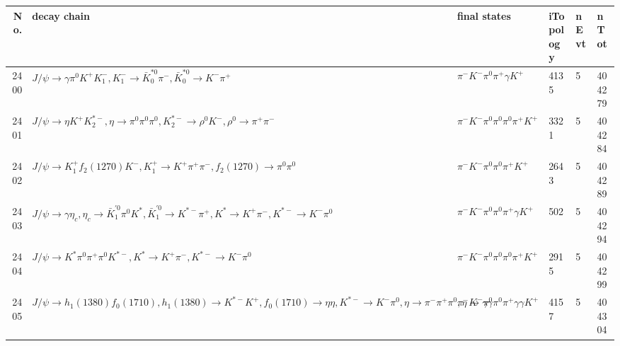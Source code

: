 \begin{table}[htbp] 
\begin{center}
\begin{small}
\begin{tabular}{rlllll}\hline\hline
 No. & decay chain & final states &  iTopology & nEvt & nTot \\\hline
2400&$J/\psi       \rightarrow \gamma       \pi^{0}        K^{+}          K_{1}^{-}      , K_{1}^{-}       \rightarrow \bar{K}_0^{*0}\pi^{-}        , \bar{K}_0^{*0} \rightarrow K^{-}          \pi^{+}        $&$\pi^{-}        K^{-}          \pi^{0}        \pi^{+}        \gamma       K^{+}          $& 4135&    5&404279\\
2401&$J/\psi       \rightarrow \eta          K^{+}          K_2^{*-}       , \eta           \rightarrow \pi^{0}        \pi^{0}        \pi^{0}        , K_2^{*-}        \rightarrow \rho^{0}      K^{-}          , \rho^{0}       \rightarrow \pi^{+}        \pi^{-}        $&$\pi^{-}        K^{-}          \pi^{0}        \pi^{0}        \pi^{0}        \pi^{+}        K^{+}          $& 3321&    5&404284\\
2402&$J/\psi       \rightarrow K_1^{+}        f_{2}(1270)    K^{-}          , K_1^{+}         \rightarrow K^{+}          \pi^{+}        \pi^{-}        , f_{2}(1270)     \rightarrow \pi^{0}        \pi^{0}        $&$\pi^{-}        K^{-}          \pi^{0}        \pi^{0}        \pi^{+}        K^{+}          $& 2643&    5&404289\\
2403&$J/\psi       \rightarrow \gamma       \eta_{c}    , \eta_{c}     \rightarrow \bar{K}_1^{'0}\pi^{0}        K^{*}          , \bar{K}_1^{'0} \rightarrow K^{*-}         \pi^{+}        , K^{*}           \rightarrow K^{+}          \pi^{-}        , K^{*-}          \rightarrow K^{-}          \pi^{0}        $&$\pi^{-}        K^{-}          \pi^{0}        \pi^{0}        \pi^{+}        \gamma       K^{+}          $&  502&    5&404294\\
2404&$J/\psi       \rightarrow K^{*}          \pi^{0}        \pi^{+}        \pi^{0}        K^{*-}         , K^{*}           \rightarrow K^{+}          \pi^{-}        , K^{*-}          \rightarrow K^{-}          \pi^{0}        $&$\pi^{-}        K^{-}          \pi^{0}        \pi^{0}        \pi^{0}        \pi^{+}        K^{+}          $& 2915&    5&404299\\
2405&$J/\psi       \rightarrow h_{1}(1380)    f_{0}(1710)    , h_{1}(1380)     \rightarrow K^{*-}         K^{+}          , f_{0}(1710)     \rightarrow \eta          \eta          , K^{*-}          \rightarrow K^{-}          \pi^{0}        , \eta           \rightarrow \pi^{-}        \pi^{+}        \pi^{0}        , \eta           \rightarrow \gamma       \gamma       $&$\pi^{-}        K^{-}          \pi^{0}        \pi^{0}        \pi^{+}        \gamma       \gamma       K^{+}          $& 4157&    5&404304\\

\end{tabular}
\end{small}
\end{center}
\end{table}
